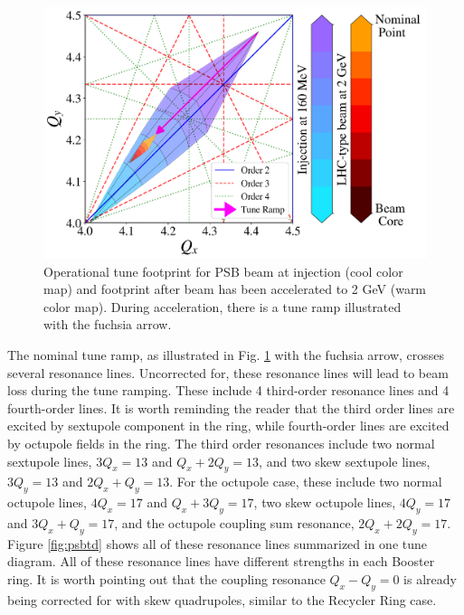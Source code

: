 \begin{figure}[H]
    \centering
    \includegraphics[width=\linewidth,keepaspectratio]{chapter5/operational.png}
    \caption{Operational tune footprint for PSB beam at injection (cool color map) and footprint after beam has been accelerated to 2 GeV (warm color map). During acceleration, there is a tune ramp illustrated with the fuchsia arrow.}
    \label{fig:operational_psb}
\end{figure}

The nominal tune ramp, as illustrated in Fig. \ref{fig:operational_psb} with the fuchsia arrow, crosses several resonance lines. Uncorrected for, these resonance lines will lead to beam loss during the tune ramping. These include 4 third-order resonance lines and 4 fourth-order lines. It is worth reminding the reader that the third order lines are excited by sextupole component in the ring, while fourth-order lines are excited by octupole fields in the ring. The third order resonances include two normal sextupole lines, $3Q_x = 13$ and $Q_x+2Q_y = 13$, and two skew sextupole lines, $3Q_y = 13$ and $2Q_x+Q_y = 13$. For the octupole case, these include two normal octupole lines, $4Q_x = 17$ and $Q_x+3Q_y = 17$, two skew octupole lines, $4Q_y = 17$ and $3Q_x+Q_y = 17$, and the octupole coupling sum resonance, $2Q_x +2Q_y =17$. Figure \ref{fig:psbtd} shows all of these resonance lines summarized in one tune diagram. All of these resonance lines have different strengths in each Booster ring. It is worth pointing out that the coupling resonance $Q_x - Q_y = 0$ is already being corrected for with skew quadrupoles, similar to the Recycler Ring case.   

